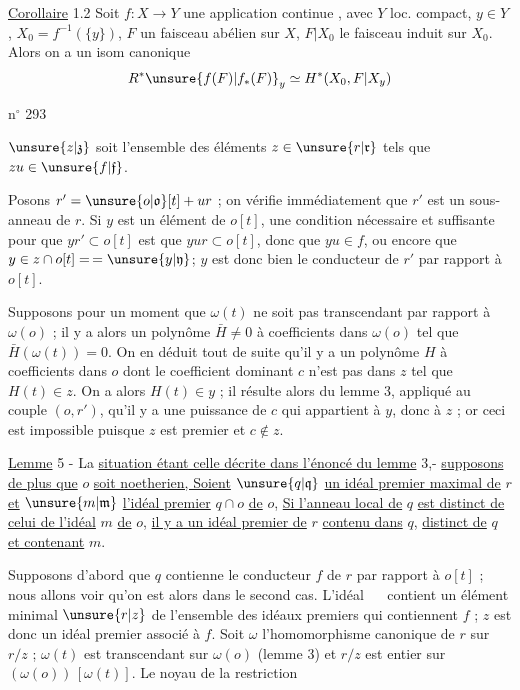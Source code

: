 \uline{Corollaire} 1.2 Soit $f:X\longrightarrow Y$ une application continue , avec $Y$ loc. compact,  $y\in Y$, $X_0=f^{-1}(\{y\})$, $F$ un faisceau abélien sur $X$, $F|X_0$ le faisceau induit sur $X_0$. Alors on a un isom canonique
\[
R^*\unsure{f(F)|f_*(F)}_y\simeq H^*(X_0,F|X_y)
\]

\hfill n$^\circ$ 293

$\unsure{z|\mathfrak z}$ soit l'ensemble des éléments $z\in\unsure{r|\mathfrak r}$ tels que $zu\in\unsure{f|\mathfrak f}$.

Posons $r'=\unsure{o|\mathfrak o}[t]+ur$ ; on vérifie immédiatement que $r'$ est un sous-anneau de $r$. Si $y$ est un élément de $o[t]$, une condition nécessaire et suffisante pour que $yr'\subset o[t]$ est que $yur\subset o[t]$, donc que $yu\in f$, ou encore que $y\in z\cap o[t]=\,=\unsure{y|\mathfrak y}$; $y$ est donc bien le conducteur de $r'$ par rapport à $o[t]$.

Supposons pour un moment que $\omega(t)$ ne soit pas transcendant par rapport à $\omega(o)$ ; il y a alors un polynôme $\bar H\ne0$ à coefficients dans $\omega(o)$ tel que $\bar H(\omega(t))=0$. On en déduit tout de suite qu'il y a un polynôme $H$ à coefficients dans $o$ dont le coefficient dominant $c$ n'est pas dans $z$ tel que $H(t)\in z$. On a alors $H(t)\in y$ ; il résulte alors du lemme 3, appliqué au couple $(o,r')$, qu'il y a une puissance de $c$ qui appartient à $y$, donc à $z$ ; or ceci est impossible puisque $z$ est premier et $c\notin z$.

\uline{Lemme} 5 - La \uline{situation étant celle décrite dans l'énoncé du lemme} 3,- \uline{supposons de plus que} $o$ \uline{soit noetherien, Soient} $\unsure{q|\mathfrak q}$ \uline{un idéal premier maximal de} $r$ \uline{et} $\unsure{m|\mathfrak m}$ \uline{l'idéal premier} $q\cap o$ \uline{de} $o$, \uline{Si l'anneau local de} $q$ \uline{est distinct de celui de l'idéal} $m$ \uline{de} $o$, \uline{il y a un idéal premier de} $r$ \uline{contenu dans} $q$, \uline{distinct de} $q$ \uline{et contenant} $m$.

Supposons d'abord que $q$ contienne le conducteur $f$ de $r$ par rapport à $o[t]$ ; nous allons voir qu'on est alors dans le second cas. L'idéal $\quad$ contient un élément minimal $\unsure{r|z}$ de l'ensemble des idéaux premiers qui contiennent $f$ ; $z$ est donc un idéal premier associé à $f$. Soit $\omega$ l'homomorphisme canonique de $r$ sur $r/z$ ; $\omega(t)$ est transcendant sur $\omega(o)$ (lemme 3) et $r/z$ est entier sur $(\omega(o))\,[\omega(t)]$. Le noyau de la restriction

